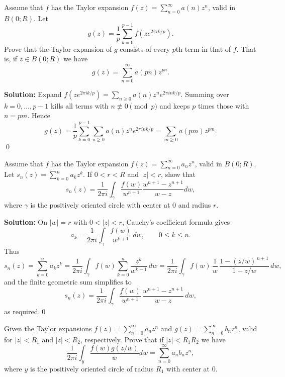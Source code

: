 \begin{problembox}
Assume that \( f \) has the Taylor expansion \( f(z) = \sum_{n=0}^{\infty} a(n)z^n \), valid in \( B(0; R) \). Let
\[g(z) = \frac{1}{p} \sum_{k=0}^{p-1} f(ze^{2\pi ik/p}).\]
Prove that the Taylor expansion of \( g \) consists of every \( p \)th term in that of \( f \). That is, if \( z \in B(0; R) \) we have
\[g(z) = \sum_{n=0}^{\infty} a(pn)z^{pn}.\]
\end{problembox}

\noindent\textbf{Solution:}
Expand $f(ze^{2\pi ik/p})=\sum_{n\ge0} a(n) z^n e^{2\pi i n k/p}$. Summing over $k=0,\dots,p-1$ kills all terms with $n\not\equiv0\pmod p$ and keeps $p$ times those with $n=pm$. Hence
\[g(z)=\frac1p\sum_{k=0}^{p-1}\sum_{n\ge0} a(n)z^n e^{2\pi i nk/p}=\sum_{m\ge0}a(pm) z^{pm}.\]\qed


\begin{problembox}
Assume that \( f \) has the Taylor expansion \( f(z) = \sum_{n=0}^{\infty} a_n z^n \), valid in \( B(0; R) \). Let \( s_n(z) = \sum_{k=0}^{n} a_k z^k \). If \( 0 < r < R \) and \( |z| < r \), show that
\[ s_n(z) = \frac{1}{2\pi i} \int_\gamma \frac{f(w)}{w^{n+1}} \frac{w^{n+1} -z^{n+1}}{w - z} dw, \]
where \( \gamma \) is the positively oriented circle with center at 0 and radius \( r \).
\end{problembox}

\noindent\textbf{Solution:}
On $|w|=r$ with $0<|z|<r$, Cauchy's coefficient formula gives
\[a_k=\frac{1}{2\pi i}\int_\gamma \frac{f(w)}{w^{k+1}}\,dw,\qquad 0\le k\le n.\]
Thus
\[ s_n(z)=\sum_{k=0}^n a_k z^k=\frac{1}{2\pi i}\int_\gamma f(w)\sum_{k=0}^n \frac{z^k}{w^{k+1}}\,dw
=\frac{1}{2\pi i}\int_\gamma f(w)\,\frac{1}{w}\,\frac{1-(z/w)^{\,n+1}}{1-z/w}\,dw,\]
and the finite geometric sum simplifies to
\[ s_n(z)=\frac{1}{2\pi i}\int_\gamma \frac{f(w)}{w^{n+1}}\,\frac{w^{n+1}-z^{n+1}}{w-z}\,dw, \]
as required.\qed


\begin{problembox}
Given the Taylor expansions \( f(z) = \sum_{n=0}^{\infty} a_n z^n \) and \( g(z) = \sum_{n=0}^{\infty} b_n z^n \), valid for \( |z| < R_1 \) and \( |z| < R_2 \), respectively. Prove that if \( |z| < R_1 R_2 \) we have
\[ \frac{1}{2\pi i} \int_y \frac{f(w) g(z/w)}{w} dw = \sum_{n=0}^{\infty} a_n b_n z^n, \]
where \( y \) is the positively oriented circle of radius \( R_1 \) with center at 0.
\end{problembox}

